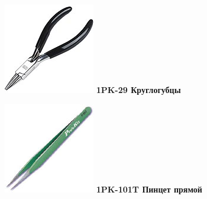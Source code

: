 \documentclass{magazine}
\begin{document}
{\begin{multicols}{2}
\noindent\includegraphics[width=\columnwidth]{fig/00/pros/1PK-29.jpg}
\textbf{1PK-29 Круглогубцы}

\noindent\includegraphics[width=\columnwidth]{fig/00/pros/1PK-101T.jpg}
\textbf{1PK-101T Пинцет прямой}


\end{multicols}}
\end{document}
